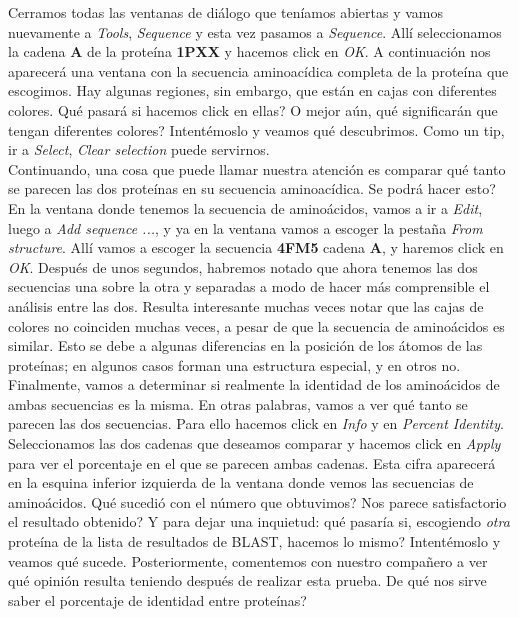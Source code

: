 \documentclass[10pt,letterpaper]{article}
\begin{document}
Cerramos todas las ventanas de di\'alogo que ten\'iamos abiertas y vamos nuevamente a \emph{Tools}, \emph{Sequence} y esta vez pasamos a \emph{Sequence}. All\'i seleccionamos la cadena \textbf{A} de la prote\'ina \textbf{1PXX} y hacemos click en \emph{OK}. A continuaci\'on nos aparecer\'a una ventana con la secuencia aminoac\'idica completa de la prote\'ina que escogimos. Hay algunas regiones, sin embargo, que est\'an en cajas con diferentes colores. Qu\'e pasar\'a si hacemos click en ellas? O mejor a\'un, qu\'e significar\'an que tengan diferentes colores? Intent\'emoslo y veamos qu\'e descubrimos. Como un tip, ir a \emph{Select}, \emph{Clear selection} puede servirnos.\\

Continuando, una cosa que puede llamar nuestra atenci\'on es comparar qu\'e tanto se parecen las dos prote\'inas en su secuencia aminoac\'idica. Se podr\'a hacer esto? En la ventana donde tenemos la secuencia de amino\'acidos, vamos a ir a \emph{Edit}, luego a \emph{Add sequence ...}, y ya en la ventana vamos a escoger la pesta\~na \emph{From structure}. All\'i vamos a escoger la secuencia \textbf{4FM5} cadena \textbf{A}, y haremos click en \emph{OK}. Despu\'es de unos segundos, habremos notado que ahora tenemos las dos secuencias una sobre la otra y separadas a modo de hacer m\'as comprensible el an\'alisis entre las dos. Resulta interesante muchas veces notar que las cajas de colores no coinciden muchas veces, a pesar de que la secuencia de amino\'acidos es similar. Esto se debe a algunas diferencias en la posici\'on de los \'atomos de las prote\'inas; en algunos casos forman una estructura especial, y en otros no.\\

Finalmente, vamos a determinar si realmente la identidad de los amino\'acidos de ambas secuencias es la misma. En otras palabras, vamos a ver qu\'e tanto se parecen las dos secuencias. Para ello hacemos click en \emph{Info} y en \emph{Percent Identity}. Seleccionamos las dos cadenas que deseamos comparar y hacemos click en \emph{Apply} para ver el porcentaje en el que se parecen ambas cadenas. Esta cifra aparecer\'a en la esquina inferior izquierda de la ventana donde vemos las secuencias de amino\'acidos. Qu\'e sucedi\'o con el n\'umero que obtuvimos? Nos parece satisfactorio el resultado obtenido? Y para dejar una inquietud: qu\'e pasar\'ia si, escogiendo \emph{otra} prote\'ina de la lista de resultados de BLAST, hacemos lo mismo? Intent\'emoslo y veamos qu\'e sucede. Posteriormente, comentemos con nuestro compa\~nero a ver qu\'e opini\'on resulta teniendo despu\'es de realizar esta prueba. De qu\'e nos sirve saber el porcentaje de identidad entre prote\'inas?\\
\end{document}
